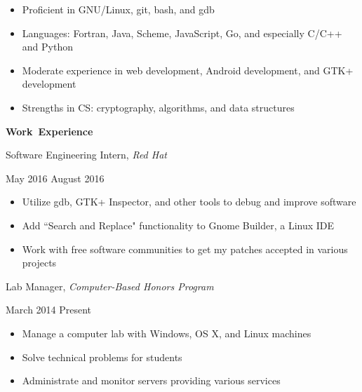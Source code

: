 \documentclass[11pt]{article}
\begin{document}
\begin{itemize}
  \item Proficient in GNU/Linux, git, bash, and gdb
  \item Languages: Fortran, Java, Scheme, JavaScript, Go, and especially C/C++ and Python
  \item Moderate experience in web development, Android development, and GTK+ development
  \item Strengths in CS: cryptography, algorithms, and data structures
\end{itemize}

\vspace{0.8em}
\hbox{\large \textbf{Work Experience}}

\begin{minipage}[t]{0.7\textwidth}
\flushleft
Software Engineering Intern, \textit{Red Hat}\\
\end{minipage}
\begin{minipage}[t]{0.25\textwidth}
\flushright
May 2016 \space \textemdash \space August 2016\\
\end{minipage}

\begin{itemize}
  \item Utilize gdb, GTK+ Inspector, and other tools to debug and improve software
  \item Add ``Search and Replace" functionality to Gnome Builder, a Linux IDE
  \item Work with free software communities to get my patches accepted in various projects
\end{itemize}

\begin{minipage}[t]{0.7\textwidth}
\flushleft
Lab Manager, \textit{Computer-Based Honors Program}\\
\end{minipage}
\begin{minipage}[t]{0.25\textwidth}
\flushright
March 2014 \space \textemdash \space Present\\
\end{minipage}

\begin{itemize}
  \item Manage a computer lab with Windows, OS X, and Linux machines
  \item Solve technical problems for students
  \item Administrate and monitor servers providing various services
\end{itemize}
\end{document}
